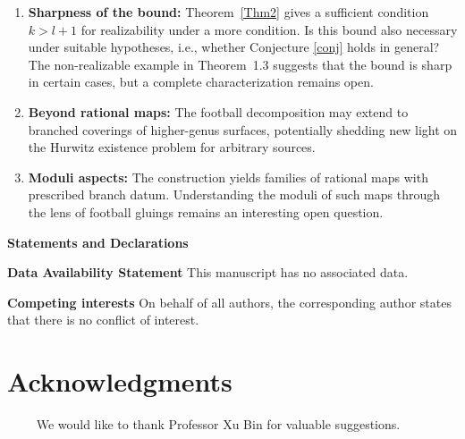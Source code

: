 \documentclass[microtype]{gtpart}     %
\theoremstyle{definition}
\begin{document}
\begin{enumerate}
\item \textbf{Sharpness of the bound:} Theorem~\ref{Thm2} gives a sufficient
      condition $k > l + 1$ for realizability under a more condition. Is this bound also
      necessary under suitable hypotheses, i.e., whether Conjecture \ref{conj} holds in general? The non-realizable example
      in Theorem~1.3 suggests that the bound is sharp in certain cases,
      but a complete characterization remains open.

\item \textbf{Beyond rational maps:} The football decomposition may
      extend to branched coverings of higher-genus surfaces, potentially
      shedding new light on the Hurwitz existence problem for arbitrary
      sources.

\item \textbf{Moduli aspects:} The construction yields families of
      rational maps with prescribed branch datum. Understanding the moduli
      of such maps through the lens of football gluings remains an
      interesting open question.
\end{enumerate}
\textbf{Statements and Declarations}


\textbf{Data Availability Statement}  This manuscript has no associated data.

\textbf{Competing interests} On behalf of all authors, the corresponding author states that there is no conflict of interest.

\section*{Acknowledgments}
~~~~
We would like to thank Professor Xu Bin for valuable suggestions.












%
%
%
%
%
\end{document}
